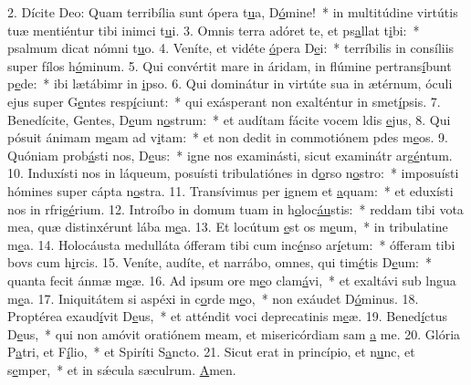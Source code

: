2. Dícite Deo: Quam terribília sunt ópera t\uline{u}a, D\uline{ó}mine!~* in multitúdine virtútis tuæ mentiéntur tibi inimci t\uline{u}i.
3. Omnis terra adóret te, et ps\uline{a}llat t\uline{i}bi:~* psalmum dicat nómni t\uline{u}o.
4. Veníte, et vidéte \uline{ó}pera D\uline{e}i:~* terríbilis in consíliis super fílos h\uline{ó}minum.
5. Qui convértit mare in áridam, in flúmine pertrans\uline{í}bunt p\uline{e}de:~* ibi lætábimr in \uline{i}pso.
6. Qui dominátur in virtúte sua in ætérnum, óculi ejus super G\uline{e}ntes resp\uline{í}ciunt:~* qui exásperant non exalténtur in smet\uline{í}psis.
7. Benedícite, Gentes, D\uline{e}um n\uline{o}strum:~* et audítam fácite vocem ldis \uline{e}jus,
8. Qui pósuit ánimam m\uline{e}am ad v\uline{i}tam:~* et non dedit in commotiónem pdes m\uline{e}os.
9. Quóniam prob\uline{á}sti nos, D\uline{e}us:~* igne nos examinásti, sicut examinátr arg\uline{é}ntum.
10. Induxísti nos in láqueum, posuísti tribulatiónes in d\uline{o}rso n\uline{o}stro:~* imposuísti hómines super cápta n\uline{o}stra.
11. Transívimus per \uline{i}gnem et \uline{a}quam:~* et eduxísti nos in rfrig\uline{é}rium.
12. Introíbo in domum tuam in h\uline{o}loc\uline{áu}stis:~* reddam tibi vota mea, quæ distinxérunt lába m\uline{e}a.
13. Et locútum \uline{e}st os m\uline{e}um,~* in tribulatine m\uline{e}a.
14. Holocáusta medulláta ófferam tibi cum inc\uline{é}nso ar\uline{í}etum:~* ófferam tibi bovs cum h\uline{i}rcis.
15. Veníte, audíte, et narrábo, omnes, qui tim\uline{é}tis D\uline{e}um:~* quanta fecit ánmæ m\uline{e}æ.
16. Ad ipsum ore m\uline{e}o clam\uline{á}vi,~* et exaltávi sub lngua m\uline{e}a.
17. Iniquitátem si aspéxi in c\uline{o}rde m\uline{e}o,~* non exáudet D\uline{ó}minus.
18. Proptérea exaud\uline{í}vit D\uline{e}us,~* et atténdit voci deprecatinis m\uline{e}æ.
19. Bened\uline{í}ctus D\uline{e}us,~* qui non amóvit oratiónem meam, et misericórdiam sam \uline{a} me.
20. Glória P\uline{a}tri, et F\uline{í}lio,~* et Spiríti S\uline{a}ncto.
21. Sicut erat in princípio, et n\uline{u}nc, et s\uline{e}mper,~* et in sǽcula sæculrum. \uline{A}men.
